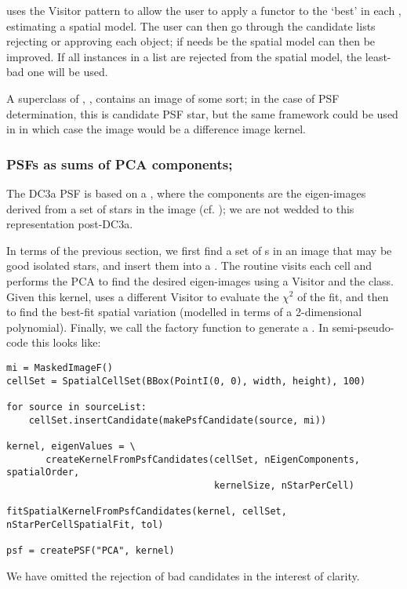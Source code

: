  uses the Visitor pattern \citep{GoF} to allow the user to apply a functor to the `best'
 in each , estimating a spatial model.  The user can then go through the
candidate lists rejecting or approving each object; if needs be the spatial model can then be improved.  If all
instances in a list are rejected from the spatial model, the least-bad one will be used.

A superclass of , , contains an image
of some sort; in the case of PSF determination, this is candidate PSF star, but the
same framework could be used in  in which case the image would
be a difference image kernel.


\subsubsection{PSFs as sums of PCA components; }

The DC3a PSF is based on a , where
the components are the eigen-images derived from a set of stars in the image (cf. \citet{photoADASS});
we are not wedded to this representation post-DC3a.

In terms of the previous section,  we first find a set of s in an image
that may be good isolated stars,  and insert them into a .  The
routine  visits each cell and performs the PCA
to find the desired eigen-images using a Visitor and the  class.
Given this kernel,  uses a different
Visitor to evaluate the $\chi^2$ of the fit, and then  to find
the best-fit spatial variation (modelled in terms of a 2-dimensional polynomial).  Finally,
we call the  factory function to generate a .
In semi-pseudo-code this looks like:

\begin{center}
  \begin{minipage}{13cm}
    \small
\begin{verbatim}
mi = MaskedImageF()
cellSet = SpatialCellSet(BBox(PointI(0, 0), width, height), 100)

for source in sourceList:
    cellSet.insertCandidate(makePsfCandidate(source, mi))

kernel, eigenValues = \
       createKernelFromPsfCandidates(cellSet, nEigenComponents, spatialOrder,
                                     kernelSize, nStarPerCell)

fitSpatialKernelFromPsfCandidates(kernel, cellSet, nStarPerCellSpatialFit, tol)

psf = createPSF("PCA", kernel)
\end{verbatim}
  \end{minipage}
\end{center}
We have omitted the rejection of bad candidates in the interest of clarity.
